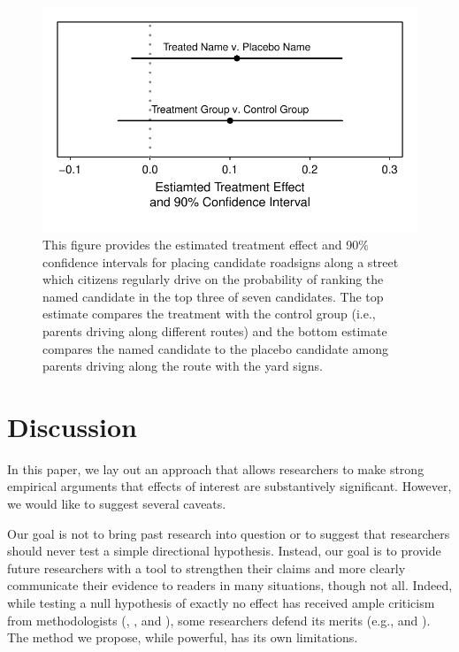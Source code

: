 \documentclass[12pt]{article}
\begin{document}
\begin{figure}[H]
\begin{center}
\includegraphics[scale = .8]{figs/kz-ci.pdf}
\caption{This figure provides the estimated treatment effect and 90\% confidence intervals for placing candidate roadsigns along a street which citizens regularly drive on the probability of ranking the named candidate in the top three of seven candidates. The top estimate compares the treatment with the control group (i.e., parents driving along different routes) and the bottom estimate compares the named candidate to the placebo candidate among parents driving along the route with the yard signs.}\label{fig:kz-ci}
\end{center}
\end{figure}

\section*{Discussion}

In this paper, we lay out an approach that allows researchers to make strong empirical arguments that effects of interest are substantively significant. However, we would like to suggest several caveats.

Our goal is not to bring past research into question or to suggest that researchers should never test a simple directional hypothesis. Instead, our goal is to provide future researchers with a tool to strengthen their claims and more clearly communicate their evidence to readers in many situations, though not all. Indeed, while testing a null hypothesis of exactly no effect has received ample criticism from methodologists (\citealt{Gill1999}, \citealt{Gross2014}, and \citealt{HillJones2014}), some researchers defend its merits (e.g., \citealt{Hagen1997} and \citealt{Wainer1999}). The method we propose, while powerful, has its own limitations.
\end{document}
